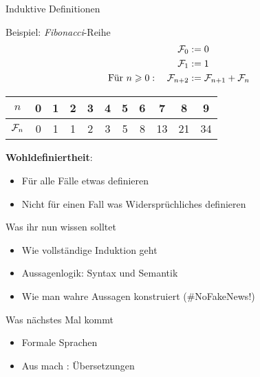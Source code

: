 \newcommand{\Fib}{\mathcal{F}\hspace{-1pt}}

\begin{frame}{Induktive Definitionen}
	\begin{exampleblock}{Beispiel: \emph{Fibonacci}-Reihe}
		\begin{align*}
		\Fib_0 &:= 0 \\
		\Fib_1 &:= 1 \\
		\text{Für } n \geq 0: \quad \Fib_{n+2} &:= \Fib_{n+1} + \Fib_n 		
		\end{align*}
		\pause
		\begin{table}
			\centering
			\begin{tabular}{|c|c|c|c|c|c|c|c|c|c|c|}
				\hline
				$n$ & 0 & 1 & 2 & 3 & 4 & 5 & 6 & 7 & 8 & 9 \\ \hline
				$\Fib_n$ & 0 & 1 & 1 & 2 & 3 & 5 & 8 & 13 & 21 & 34 \\ \hline
			\end{tabular}
		\end{table}
		
		\pause
		\textbf{Wohldefiniertheit}: 
		\begin{itemize}
			\item Für alle Fälle etwas definieren 
			\item Nicht für einen Fall was Widersprüchliches definieren
		\end{itemize}
		
	\end{exampleblock}
	
\end{frame}







\begin{frame}	
	\begin{block}{Was ihr nun wissen solltet}
		\begin{itemize}
			\item Wie vollständige Induktion geht
			\item Aussagenlogik: Syntax und Semantik
			\item Wie man wahre Aussagen konstruiert \qquad (\#NoFakeNews!) 
		\end{itemize}
	\end{block}
	
	\begin{block}{Was nächstes Mal kommt}
		\begin{itemize}
			\item Formale Sprachen
			\item Aus  mach : Übersetzungen
		\end{itemize}
	\end{block}
\end{frame}

\slideThanks


